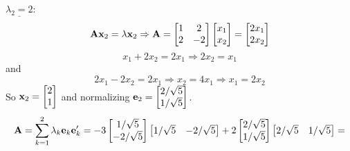         \newline
        $\underline{\lambda_2 = 2}$:
        \[
            \bold{A}\bold{x}_2 = \lambda\bold{x}_2
            \Rightarrow
            \bold{A} = \begin{bmatrix}
                1 & 2 \\
                2 & -2
            \end{bmatrix}
            \begin{bmatrix}
                x_1 \\
                x_2
            \end{bmatrix}
            =
            \begin{bmatrix}
                2x_1 \\
                2x_2
            \end{bmatrix}
        \]
        \[
            x_1 + 2x_2 = 2x_1
            \Rightarrow
            2x_2 = x_1
        \]
        and
        \[
            2x_1 - 2x_2 = 2x_1
            \Rightarrow
            x_2 = 4x_1
            \Rightarrow
            x_1 = 2x_2
        \]
        So $\bold{x}_2 = \begin{bmatrix}
            2 \\
            1
        \end{bmatrix}$ and normalizing $\bold{e}_2 = \begin{bmatrix}
            2/\sqrt{5} \\
            1/\sqrt{5}
        \end{bmatrix}$.
        \newline
        \[
            \bold{A} = \sum_{k=1}^2{\lambda_k \bold{e}_k \bold{e}_k^\prime}
            =
            -3 \begin{bmatrix}
                1/\sqrt{5} \\
                -2/\sqrt{5}
            \end{bmatrix}
            \begin{bmatrix}
                1/\sqrt{5} & -2/\sqrt{5}
            \end{bmatrix}
            +
            2 \begin{bmatrix}
                2/\sqrt{5} \\
                1/\sqrt{5}
            \end{bmatrix}
            \begin{bmatrix}
                2/\sqrt{5} & 1/\sqrt{5}
            \end{bmatrix}
            =
        \]
